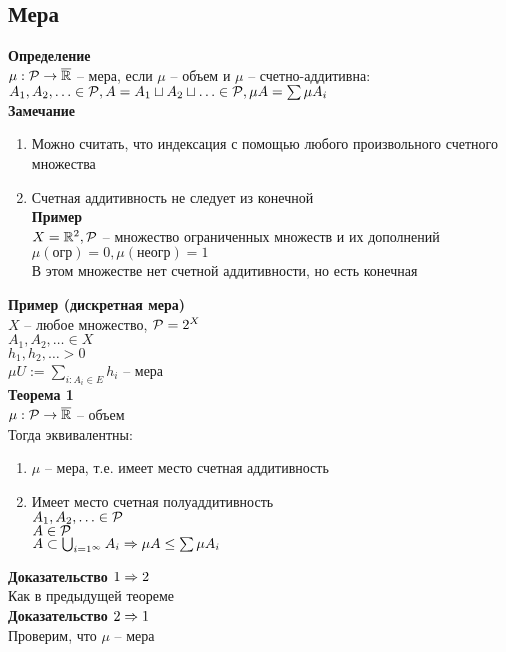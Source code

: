 \documentclass[12pt]{article}
\begin{document}
\subsection{Мера}
\textbf{Определение}\\
$\mu: \mathcal P \rightarrow \overline{\mathbb{R}}$ -- мера, если $\mu$ -- объем и $\mu$ -- счетно-аддитивна:\\
$A_1, A_2, \ldots \in \mathcal P, A = A_1\sqcup A_2 \sqcup \ldots \in \mathcal P, \mu A = \sum \mu A_i$\\
\textbf{Замечание}
\begin{enumerate}
    \item Можно считать, что индексация с помощью любого произвольного счетного множества
    \item Счетная аддитивность не следует из конечной\\
    \textbf{Пример}\\
    $X = \mathbb{R}^2, \mathcal P$ -- множество ограниченных множеств и их дополнений\\
    $\mu(\text{огр}) = 0, \mu(\text{неогр}) = 1$\\
    В этом множестве нет счетной аддитивности, но есть конечная
\end{enumerate}
\textbf{Пример (дискретная мера)}\\
$X$ -- любое множество, $\mathcal P = 2^X$\\
$A_1, A_2, \ldots \in X$\\
$h_1, h_2, \ldots > 0$\\
$\mu U := \sum_{i: A_i \in E} h_i$ -- мера\\
\textbf{Теорема 1}\\
$\mu: \mathcal P \rightarrow \overline{\mathbb{R}}$ -- объем\\
Тогда эквивалентны:
\begin{enumerate}
    \item $\mu$ -- мера, т.е. имеет место счетная аддитивность
    \item Имеет место счетная полуаддитивность\\
    $A_1, A_2, \ldots \in \mathcal P$\\
    $A \in \mathcal P$\\
    $A \subset \bigcup_{i=1^{\infty}} A_i \Rightarrow \mu A \leq \sum \mu A_i$
\end{enumerate}
\textbf{Доказательство $1\Rightarrow 2$}\\
Как в предыдущей теореме\\
\textbf{Доказательство $2 \Rightarrow 1$}\\
Проверим, что $\mu$ -- мера\\
\end{document}
